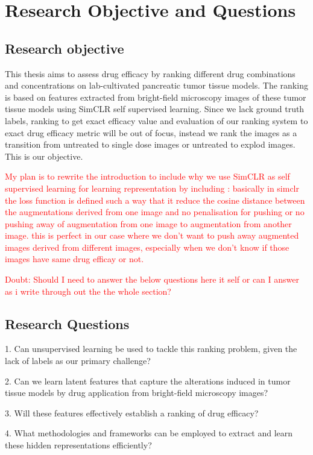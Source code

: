 \chapter{Research Objective and Questions}\label{ch:Research Objectives and Questions}
\section*{Research objective}
This thesis aims to assess drug efficacy by ranking different drug combinations and concentrations on lab-cultivated pancreatic tumor tissue models. 
The ranking is based on features extracted from bright-field microscopy images of these tumor tissue models using
SimCLR self supervised learning. Since we lack ground truth labels, ranking to get exact efficacy value and evaluation of our ranking system to exact drug efficacy metric 
 will be out of focus, instead we rank the images as a transition from untreated to single dose images or untreated to explod images. This is our objective.  


\textcolor{red}{My plan is to rewrite the introduction to include why we use SimCLR as self supervised learning for learning representation by including :
 basically in simclr the loss function is defined such a way that it reduce the cosine distance between the augmentations derived from one image  and no 
 penalisation for pushing or no pushing away of augmentation from one image to augmentation from another image. this is perfect in our case where 
 we don't want to push away augmented images derived from different images, especially when we don't know if those images have same drug efficay or not.}

\textcolor{red}{Doubt: Should I need to answer the below questions here it self or can I answer as i write through out the the whole section?}

\section*{Research Questions}
1. Can unsupervised learning be used to tackle this ranking problem, given the lack of labels as our primary challenge?

2. Can we learn latent features that capture the alterations induced in tumor tissue models by drug application from bright-field microscopy images?

3. Will these features effectively establish a ranking of drug efficacy?

4. What methodologies and frameworks can be employed to extract and learn these hidden representations efficiently?


